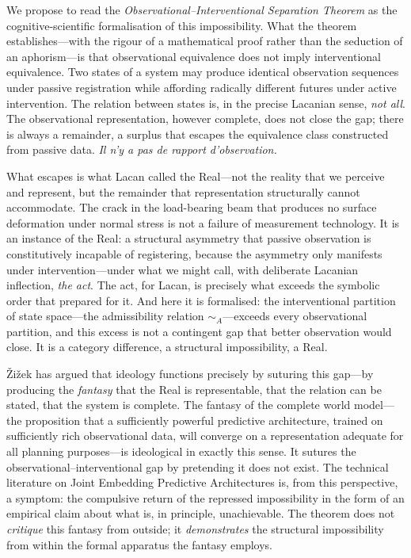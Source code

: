 \documentclass[10pt,a4paper]{article}
\begin{document}
We propose to read the \emph{Observational--Interventional Separation Theorem}
as the cognitive-scientific formalisation of this impossibility. What the theorem
establishes---with the rigour of a mathematical proof rather than the seduction
of an aphorism---is that observational equivalence does not imply interventional
equivalence. Two states of a system may produce identical observation sequences
under passive registration while affording radically different futures under
active intervention. The relation between states is, in the precise Lacanian
sense, \emph{not all}. The observational representation, however complete, does
not close the gap; there is always a remainder, a surplus that escapes the
equivalence class constructed from passive data. \emph{Il n'y a pas de rapport
d'observation.}

What escapes is what Lacan called the Real---not the reality that we perceive and
represent, but the remainder that representation structurally cannot accommodate.
The crack in the load-bearing beam that produces no surface deformation under
normal stress is not a failure of measurement technology. It is an instance of
the Real: a structural asymmetry that passive observation is constitutively
incapable of registering, because the asymmetry only manifests under
intervention---under what we might call, with deliberate Lacanian inflection,
\emph{the act}. The act, for Lacan, is precisely what exceeds the symbolic order
that prepared for it. And here it is formalised: the interventional partition
of state space---the admissibility relation $\sim_A$---exceeds every observational
partition, and this excess is not a contingent gap that better observation would
close. It is a category difference, a structural impossibility, a Real.

Žižek \citeyearpar{zizek1989sublime} has argued that ideology functions precisely
by suturing this gap---by producing the \emph{fantasy} that the Real is
representable, that the relation can be stated, that the system is complete.
The fantasy of the complete world model---the proposition that a sufficiently
powerful predictive architecture, trained on sufficiently rich observational data,
will converge on a representation adequate for all planning purposes---is
ideological in exactly this sense. It sutures the observational--interventional
gap by pretending it does not exist. The technical literature on Joint Embedding
Predictive Architectures is, from this perspective, a symptom: the compulsive
return of the repressed impossibility in the form of an empirical claim about
what is, in principle, unachievable. The theorem does not \emph{critique} this
fantasy from outside; it \emph{demonstrates} the structural impossibility
from within the formal apparatus the fantasy employs.
\end{document}
